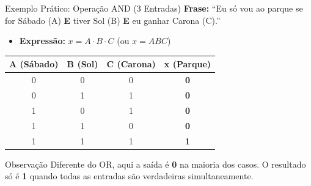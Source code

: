\begin{frame}{Exemplo Prático: Operação AND (3 Entradas)}
    \textbf{Frase:} ``Eu só vou ao parque se for Sábado (A) \textbf{E} tiver Sol (B) \textbf{E} eu ganhar Carona (C).''
    \vspace{0.4cm}
    \begin{itemize}
        \item \textbf{Expressão:} $x = A \cdot B \cdot C$ (ou $x = ABC$)
    \end{itemize}
    \vspace{0.2cm}
    \begin{table}
        \centering
        \small
        \begin{tabular}{|c|c|c||c|}
            \hline
            \textbf{A (Sábado)} & \textbf{B (Sol)} & \textbf{C (Carona)} & \textbf{x (Parque)} \\ \hline
            0                   & 0                & 0                   & \textbf{0}          \\ \hline
            0                   & 1                & 1                   & \textbf{0}          \\ \hline
            1                   & 0                & 1                   & \textbf{0}          \\ \hline
            1                   & 1                & 0                   & \textbf{0}          \\ \hline
            1                   & 1                & 1                   & \textbf{1}          \\ \hline
        \end{tabular}
    \end{table}
    \vspace{0.2cm}
    \begin{block}{Observação}
        Diferente do OR, aqui a saída é \textbf{0} na maioria dos casos. O resultado só é \textbf{1} quando todas as entradas são verdadeiras simultaneamente.
    \end{block}
\end{frame}

